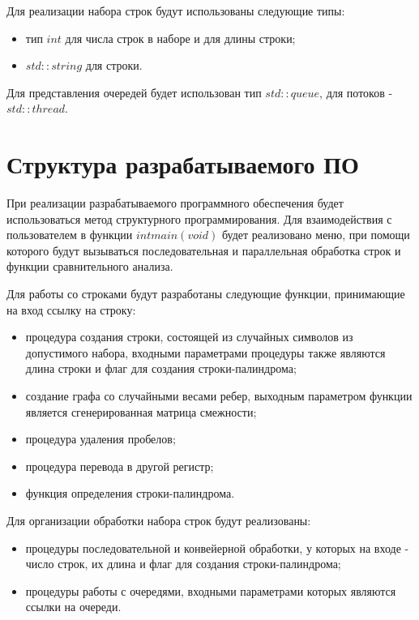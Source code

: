 Для реализации набора строк будут использованы следующие типы:
\begin{itemize}
	\item тип $int$ для числа строк в наборе и для длины строки;
	\item $std::string$ для строки.
\end{itemize}

Для представления очередей будет использован тип $std::queue$, для потоков - $std::thread$.

\section{Структура разрабатываемого ПО}

При реализации разрабатываемого программного обеспечения будет использоваться метод структурного программирования. Для взаимодействия с пользователем в функции $int  main(void)$ будет реализовано меню, при помощи которого будут вызываться последовательная и параллельная обработка строк и функции сравнительного анализа. 

Для работы со строками будут разработаны следующие функции, принимающие на вход ссылку на строку:

\begin{itemize}
	\item процедура создания строки, состоящей из случайных символов из допустимого набора, входными параметрами процедуры также являются длина строки и флаг для создания строки-палиндрома; 
	\item создание графа со случайными весами ребер, выходным параметром функции является сгенерированная матрица смежности;
	\item процедура удаления пробелов;
	\item процедура перевода в другой регистр;
	\item функция определения строки-палиндрома.
\end{itemize}

Для организации обработки набора строк будут реализованы:

\begin{itemize}
	\item процедуры последовательной и конвейерной обработки, у которых на входе - число строк, их длина и флаг для создания строки-палиндрома;
	\item процедуры работы с очередями, входными параметрами которых являются ссылки на очереди.
\end{itemize}

